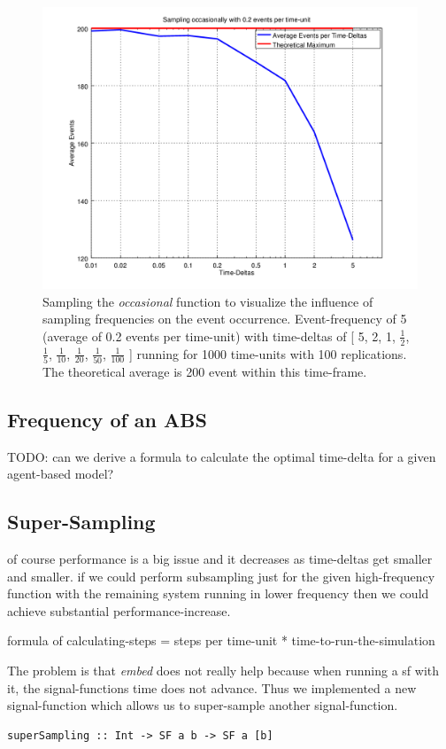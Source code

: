 \begin{figure}
	\centering
	\includegraphics[width=.6\textwidth, angle=0]{./../shared/fig/samplingTest_occasionally_02evts.png}
	\caption{Sampling the \textit{occasional} function to visualize the influence of sampling frequencies on the event occurrence. Event-frequency of 5 (average of 0.2 events per time-unit) with time-deltas of [ 5, 2, 1, $\frac{1}{2}$, $\frac{1}{5}$, $\frac{1}{10}$, $\frac{1}{20}$, $\frac{1}{50}$, $\frac{1}{100}$ ] running for 1000 time-units with 100 replications. The theoretical average is 200 event within this time-frame.}
	\label{fig:sampling_occasionally_02evts}
\end{figure}

\subsection{Frequency of an ABS}
TODO: can we derive a formula to calculate the optimal time-delta for a given agent-based model?

\subsection{Super-Sampling}
of course performance is a big issue and it decreases as time-deltas get smaller and smaller. if we could perform subsampling just for the given high-frequency function with the remaining system running in lower frequency then we could achieve substantial performance-increase.

formula of calculating-steps = steps per time-unit * time-to-run-the-simulation

The problem is that \textit{embed} does not really help because when running a sf with it, the signal-functions time does not advance. Thus we implemented a new signal-function which allows us to super-sample another signal-function.

\begin{verbatim}
superSampling :: Int -> SF a b -> SF a [b]
\end{verbatim}

